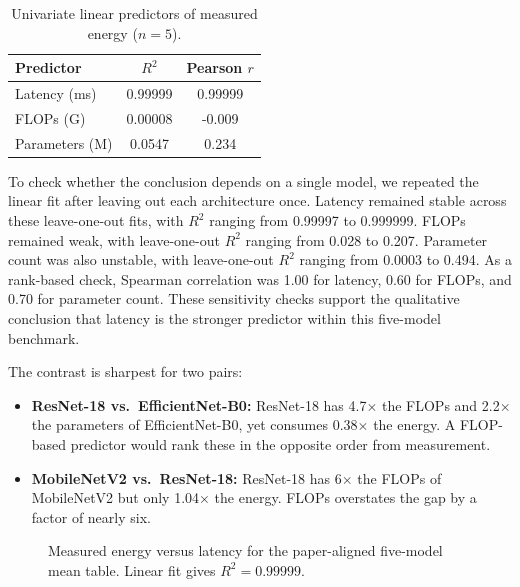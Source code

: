 \documentclass{svproc}
\begin{document}
\begin{table}[ht]
\centering
\caption{Univariate linear predictors of measured energy ($n = 5$).}
\label{tab:predictors}
\begin{tabular}{l c c}
\toprule
Predictor & $R^2$ & Pearson $r$ \\
\midrule
Latency (ms) & 0.99999 & 0.99999 \\
FLOPs (G) & 0.00008 & -0.009 \\
Parameters (M) & 0.0547 & 0.234 \\
\bottomrule
\end{tabular}
\end{table}

To check whether the conclusion depends on a single model, we repeated the
linear fit after leaving out each architecture once. Latency remained stable
across these leave-one-out fits, with $R^2$ ranging from 0.99997 to 0.999999.
FLOPs remained weak, with leave-one-out $R^2$ ranging from 0.028 to 0.207.
Parameter count was also unstable, with leave-one-out $R^2$ ranging from
0.0003 to 0.494. As a rank-based check, Spearman correlation was 1.00 for
latency, 0.60 for FLOPs, and 0.70 for parameter count. These sensitivity
checks support the qualitative conclusion that latency is the stronger
predictor within this five-model benchmark.

The contrast is sharpest for two pairs:
\begin{itemize}
\item \textbf{ResNet-18 vs.\ EfficientNet-B0:} ResNet-18 has 4.7$\times$ the
FLOPs and 2.2$\times$ the parameters of EfficientNet-B0, yet consumes
0.38$\times$ the energy. A FLOP-based predictor would rank these in the
opposite order from measurement.
\item \textbf{MobileNetV2 vs.\ ResNet-18:} ResNet-18 has 6$\times$ the FLOPs
of MobileNetV2 but only 1.04$\times$ the energy. FLOPs overstates the gap by a
factor of nearly six.
\end{itemize}

\begin{figure}[ht]
\centering
{}
\caption{Measured energy versus latency for the paper-aligned five-model mean table. Linear fit gives $R^2 = 0.99999$.}
\label{fig:energy-vs-latency}
\end{figure}
\end{document}
